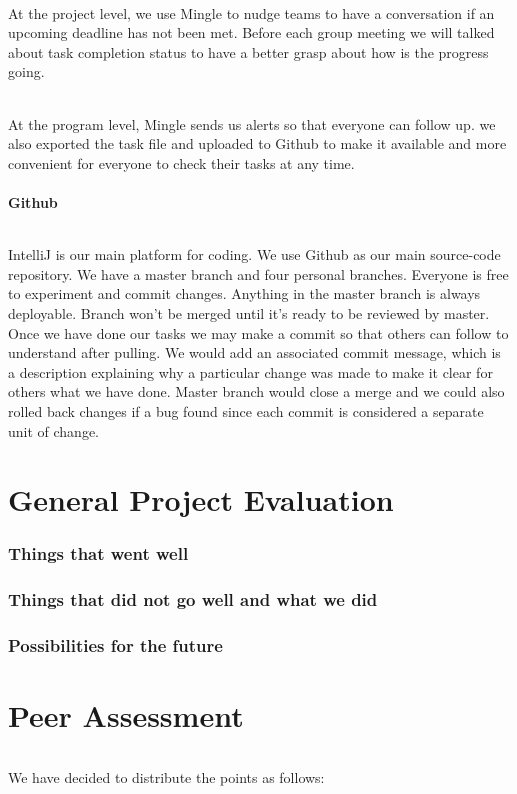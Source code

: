 \documentclass[a4paper,11pt,titlepage]{article}
\begin{document}
\paragraph{}
At the project level, we use Mingle to nudge teams to have a conversation if an upcoming deadline has not been met. Before each group meeting we will talked about task completion status to have a better grasp about how is the progress going.
\paragraph{}
At the program level, Mingle sends us alerts so that everyone can follow up. we also exported the task file and uploaded to Github to make it available and more convenient  for everyone to check their tasks at any time.
 
\subsection{Github}
\paragraph{}
IntelliJ is our main platform for coding. We use Github as our main source-code repository. We have a master branch and four personal branches. Everyone is free to experiment and commit changes. Anything in the master branch is always deployable. Branch won't be merged until it's ready to be reviewed by master. Once we have done our tasks we may make a commit so that others can follow to understand after pulling. We would add an associated commit message, which is a description explaining why a particular change was made to make it clear for others what we have done. Master branch would close a merge and we could also rolled  back changes if a bug found since each commit is considered a separate unit of change.

\part{General Project Evaluation}
\section{Things that went well}

\section{Things that did not go well and what we did}

\section{Possibilities for the future}

\part{Peer Assessment}
\paragraph{}
We have decided to distribute the points as follows:


\newpage


\end{document}
